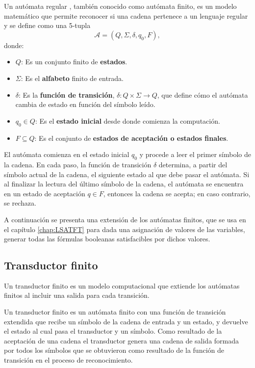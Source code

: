 \documentclass[12pt]{article}
\begin{document}
Un autómata regular \cite{authomataTheory}, también conocido como autómata finito, es un modelo matemático que permite reconocer si una cadena pertenece a un lenguaje regular y se define como una 5-tupla $$\mathcal{A} = (Q, \Sigma, \delta, q_0, F),$$ donde:

\begin{itemize}
  \item $Q$: Es un conjunto finito de \textbf{estados}.
  \item $\Sigma$: Es el \textbf{alfabeto} finito de entrada.
  \item $\delta$: Es la \textbf{función de transición}, $\delta: Q \times \Sigma \to Q$, que define cómo el autómata cambia de estado en función del símbolo leído.
  \item $q_0 \in Q$: Es el \textbf{estado inicial} desde donde comienza la computación.
  \item $F \subseteq Q$: Es el conjunto de \textbf{estados de aceptación o estados finales}.
\end{itemize}

El autómata comienza en el estado inicial $q_0$ y procede a leer el primer símbolo de la cadena.  En cada paso, la función de transición $\delta$ determina, a partir del símbolo actual de la cadena, el siguiente estado al que debe pasar el autómata.  Si al finalizar la lectura del último símbolo de la cadena, el autómata se encuentra en un estado de aceptación $q \in F$, entonces la cadena se acepta; en caso contrario, se rechaza.

A continuación se presenta una extensión de los autómatas finitos, que se usa en el capítulo \ref{chap:LSATFT} para dada una asignación de valores de las variables, generar todas las fórmulas booleanas satisfacibles por dichos valores.

\subsection{Transductor finito}

Un transductor finito \cite{finite_transducer} es un modelo computacional que extiende los autómatas finitos al incluir una salida para cada transición.

Un transductor finito es un autómata finito con una función de transición extendida que recibe un símbolo de la 
cadena de entrada y un estado, y devuelve el estado al cual pasa el transductor y un símbolo.  Como resultado de 
la aceptación de una cadena el transductor genera una cadena de salida formada por todos los símbolos que se 
obtuvieron como resultado de la función de transición en el proceso de reconocimiento.
\end{document}
